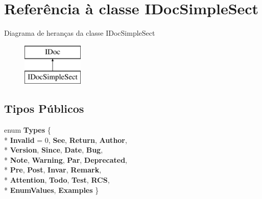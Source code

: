 \hypertarget{class_i_doc_simple_sect}{\section{Referência à classe I\-Doc\-Simple\-Sect}
\label{class_i_doc_simple_sect}
}
Diagrama de heranças da classe I\-Doc\-Simple\-Sect\begin{figure}[H]
\begin{center}
\leavevmode
\includegraphics[height=2.000000cm]{class_i_doc_simple_sect}
\end{center}
\end{figure}
\subsection*{Tipos Públicos}
\begin{DoxyCompactItemize}
\item 
enum {\bfseries Types} \{ \\*
{\bfseries Invalid} = 0, 
{\bfseries See}, 
{\bfseries Return}, 
{\bfseries Author}, 
\\*
{\bfseries Version}, 
{\bfseries Since}, 
{\bfseries Date}, 
{\bfseries Bug}, 
\\*
{\bfseries Note}, 
{\bfseries Warning}, 
{\bfseries Par}, 
{\bfseries Deprecated}, 
\\*
{\bfseries Pre}, 
{\bfseries Post}, 
{\bfseries Invar}, 
{\bfseries Remark}, 
\\*
{\bfseries Attention}, 
{\bfseries Todo}, 
{\bfseries Test}, 
{\bfseries R\-C\-S}, 
\\*
{\bfseries Enum\-Values}, 
{\bfseries Examples}
 \}
\end{DoxyCompactItemize}
